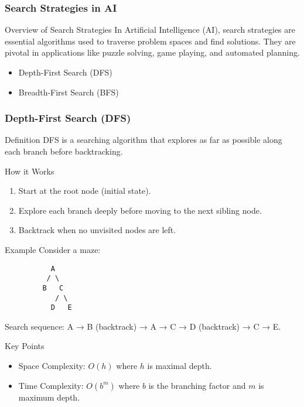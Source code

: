 \documentclass[aspectratio=169]{beamer}
\begin{document}
\begin{frame}
    \frametitle{Search Strategies in AI}
    \begin{block}{Overview of Search Strategies}
        In Artificial Intelligence (AI), search strategies are essential algorithms used to traverse problem spaces and find solutions. 
        They are pivotal in applications like puzzle solving, game playing, and automated planning.
    \end{block}

    \begin{itemize}
        \item Depth-First Search (DFS)
        \item Breadth-First Search (BFS)
    \end{itemize}
\end{frame}

\begin{frame}
    \frametitle{Depth-First Search (DFS)}
    \begin{block}{Definition}
        DFS is a searching algorithm that explores as far as possible along each branch before backtracking.
    \end{block}
    
    \begin{block}{How it Works}
        \begin{enumerate}
            \item Start at the root node (initial state).
            \item Explore each branch deeply before moving to the next sibling node.
            \item Backtrack when no unvisited nodes are left.
        \end{enumerate}
    \end{block}

    \begin{block}{Example}
        Consider a maze:
        \begin{verbatim}
           A
          / \
         B   C
            / \
           D   E
        \end{verbatim}
        Search sequence: A → B (backtrack) → A → C → D (backtrack) → C → E.
    \end{block}
    
    \begin{block}{Key Points}
        \begin{itemize}
            \item Space Complexity: $O(h)$ where $h$ is maximal depth.
            \item Time Complexity: $O(b^m)$ where $b$ is the branching factor and $m$ is maximum depth.
        \end{itemize}
    \end{block}
\end{frame}
\end{document}
